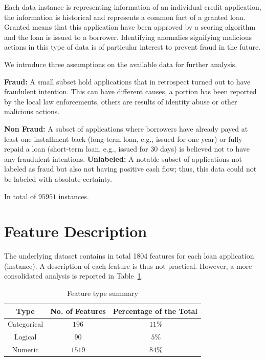 Each data instance is representing information of an individual credit application, the information is historical and represents a common fact of a granted loan. Granted means that this application have been approved by a scoring algorithm and the loan is issued to a borrower. Identifying anomalies signifying malicious actions in this type of data is of particular interest to prevent fraud in the future.

We introduce three assumptions on the available data for further analysis.

\textbf{Fraud:} 
A small subset hold applications that in retrospect turned out to have fraudulent intention. This can have different causes, a portion has been reported by the local law enforcements, others are results of identity abuse or other malicious actions.

\textbf{Non Fraud:} 
A subset of applications where borrowers have already payed at least one installment back (long-term loan, e.g., issued for one year) or fully repaid a loan (short-term loan, e.g., issued for 30 days) is believed not to have any fraudulent intentions. 
\textbf{Unlabeled:}
A notable subset of applications not labeled as fraud but also not having positive cash flow; thus, this data could not be labeled with absolute certainty.

In total of \(95951\) instances.

\section{Feature Description}\label{Ch:2:FeatureDesc}
The underlying dataset contains in total 1804 features for each loan application (instance). A description of each feature is thus not practical. However, a more consolidated analysis is reported in Table~\ref{tab:feature-summary}. 

\begin{table}[h!]
  \begin{center}
    \caption{Feature type summary}
    \label{tab:feature-summary}
    \begin{tabular}{c|c|c}
    Type & No. of Features & Percentage of the Total \\
      \hline
     Categorical & \(196\) & \(~11\%\) \\ 
     \hline
     Logical & \(90\) &  \(~5\%\) \\
     \hline
     Numeric & \(1519\) &  \(~84\%\) \\
     \hline
    \end{tabular}
  \end{center}
\end{table}

